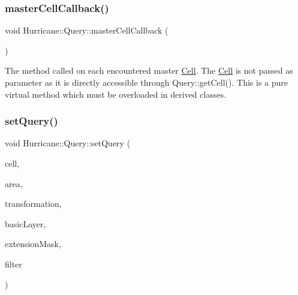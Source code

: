 \subsubsection{\texorpdfstring{master\+Cell\+Callback()}{masterCellCallback()}}
{\footnotesize\ttfamily void Hurricane\+::\+Query\+::master\+Cell\+Callback (\begin{DoxyParamCaption}{ }\end{DoxyParamCaption})\hspace{0.3cm}{\ttfamily [pure virtual]}}

The method called on each encountered master \hyperlink{classHurricane_1_1Cell}{Cell}. The \hyperlink{classHurricane_1_1Cell}{Cell} is not passed as parameter as it is directly accessible through Query\+::get\+Cell(). This is a pure virtual method which must be overloaded in derived classes. \mbox{\label{classHurricane_1_1Query_a63c50b61799b729ff4b2e7e291959b4d}} 
\subsubsection{\texorpdfstring{set\+Query()}{setQuery()}}
{\footnotesize\ttfamily void Hurricane\+::\+Query\+::set\+Query (\begin{DoxyParamCaption}\item[{\hyperlink{classHurricane_1_1Cell}{Cell} $\ast$}]{cell,  }\item[{const \hyperlink{classHurricane_1_1Box}{Box} \&}]{area,  }\item[{const \hyperlink{classHurricane_1_1Transformation}{Transformation} \&}]{transformation,  }\item[{const \hyperlink{classHurricane_1_1BasicLayer}{Basic\+Layer} $\ast$}]{basic\+Layer,  }\item[{Extension\+Slice\+::\+Mask}]{extension\+Mask,  }\item[{Mask}]{filter }\end{DoxyParamCaption})}


